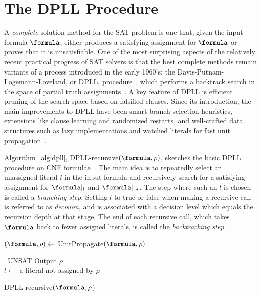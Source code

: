 \section{The DPLL Procedure}
\label{sec:dpll}

A \emph{complete} solution method for the SAT problem is one that, given the
input formula $\formula$, either produces a satisfying assignment for $\formula$
or proves that it is unsatisfiable.  One of the most surprising aspects
of the relatively recent practical progress of SAT solvers is that the best
complete methods remain variants of a process introduced in the early 1960’s:
the Davis-Putnam-Logemann-Loveland, or DPLL, procedure~\cite{satchapter}, which
performs a backtrack search in the space of partial truth
assignments~\cite{DavisLongemannLoveland:1962}. A key feature of DPLL is efficient pruning
of the search space based on falsified clauses. Since its introduction, the main
improvements to DPLL have been smart branch selection heuristics, extensions
like clause learning and randomized restarts, and well-crafted data structures
such as lazy implementations and watched literals for fast unit
propagation~\cite{satchapter}.

Algorithm~\ref{alg:dpll}, DPLL-recursive$(\formula, \rho)$, sketches the basic
DPLL procedure on CNF formulae~\cite{DavisLongemannLoveland:1962}. The main idea
is to repeatedly select an unassigned literal $l$ in the input formula and
recursively search for a satisfying assignment for $\formula|_l$ and
$\formula|_{\neg l}$. The step where such an $l$ is chosen is called a
\emph{branching step}. Setting $l$ to true or false when making a recursive call
is referred to as \emph{decision}, and is associated with a decision level which
equals the recursion depth at that stage. The end of each recursive call, which
takes $\formula$ back to fewer assigned literals, is called the
\emph{backtracking step}.


\begin{algorithm}[!ht]


    $(\formula, \rho) \leftarrow$ UnitPropagate$(\formula,\rho)$

    {\Return~UNSAT}
    {Output $\rho$\\
    }
    $l \leftarrow$ a literal not assigned by $\rho$

    {}
\caption{DPLL-recursive$(\formula, \rho$)}
\label{alg:dpll}
\end{algorithm}

